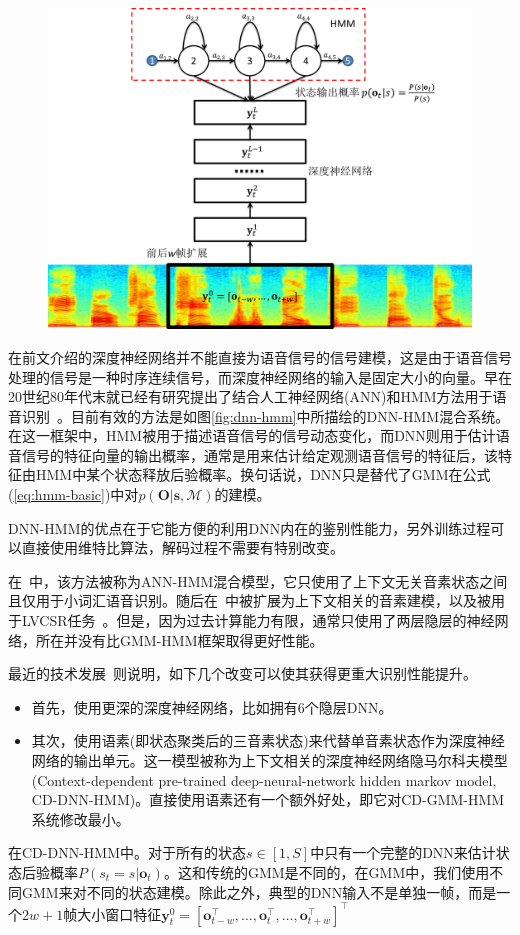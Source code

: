 \begin{figure}[!htp]
  \centering
    \captionstyle{\centering}
    \includegraphics[width=.618\textwidth]{figure/dnn_hmm.png}
\end{figure}

在前文介绍的深度神经网络并不能直接为语音信号的信号建模，这是由于语音信号处理的信号是一种时序连续信号，而深度神经网络的输入是固定大小的向量。早在20世纪80年代末就已经有研究提出了结合人工神经网络(ANN)和HMM方法用于语音识别~\cite{trentin2001survey}。目前有效的方法是如图\ref{fig:dnn-hmm}中所描绘的DNN-HMM混合系统。在这一框架中，HMM被用于描述语音信号的信号动态变化，而DNN则用于估计语音信号的特征向量的输出概率，通常是用来估计给定观测语音信号的特征后，该特征由HMM中某个状态释放后验概率。换句话说，DNN只是替代了GMM在公式(\ref{eq:hmm-basic})中对$p(\mathbf{O}|\mathbf{s},\mathcal{M})$的建模。

DNN-HMM的优点在于它能方便的利用DNN内在的鉴别性能力，另外训练过程可以直接使用维特比算法，解码过程不需要有特别改变。

在~\cite{bourlard1989continuous,bourlard1989links,morgan1990continuous}中，该方法被称为ANN-HMM混合模型，它只使用了上下文无关音素状态之间且仅用于小词汇语音识别。随后在~\cite{bourlard1992cdnn}中被扩展为上下文相关的音素建模，以及被用于LVCSR任务~\cite{robinson2002connectionist}。但是，因为过去计算能力有限，通常只使用了两层隐层的神经网络，所在并没有比GMM-HMM框架取得更好性能。

最近的技术发展~\cite{CD-DNN-HMM-dahl2012,DNN4ASR-hinton2012,seide2011conversational,yu2010roles}则说明，如下几个改变可以使其获得更重大识别性能提升。
\begin{itemize}
    \item 首先，使用更深的深度神经网络，比如拥有6个隐层DNN。
    \item 其次，使用语素(即状态聚类后的三音素状态)来代替单音素状态作为深度神经网络的输出单元。这一模型被称为上下文相关的深度神经网络隐马尔科夫模型(Context-dependent pre-trained deep-neural-network hidden markov model, CD-DNN-HMM)。直接使用语素还有一个额外好处，即它对CD-GMM-HMM系统修改最小。
\end{itemize}
在CD-DNN-HMM中。对于所有的状态$s \in [1,S]$中只有一个完整的DNN来估计状态后验概率$P(s_t=s|\mathbf{o}_t)$。这和传统的GMM是不同的，在GMM中，我们使用不同GMM来对不同的状态建模。除此之外，典型的DNN输入不是单独一帧，而是一个$2w+1$帧大小窗口特征$\mathbf{y}^0_t= [ \mathbf{o}_{t-w}^{\top}, \dots, \mathbf{o}^{\top}_t, \dots, \mathbf{o}^{\top}_{t+w} ]^{\top}$


